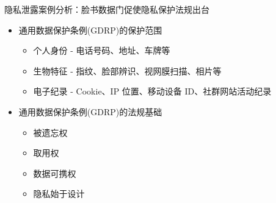 \documentclass[11pt]{beamer}
\begin{document}
\begin{frame}{隐私泄露案例分析：脸书数据门促使隐私保护法规出台}
	
	\begin{minipage}[t]{0.5\linewidth}
		\begin{itemize}
			\item 通用数据保护条例(GDRP)的保护范围
			\begin{itemize}
				\item 个人身份 - {\tiny 电话号码、地址、车牌等}
				\item 生物特征 - {\tiny  指纹、脸部辨识、视网膜扫描、相片等}
				\item 电子纪录 - {\tiny Cookie、IP 位置、移动设备 ID、社群网站活动纪录}
			\end{itemize}
			\item 通用数据保护条例(GDRP)的法规基础
			\begin{itemize}
				\item 被遗忘权
				\item 取用权
				\item 数据可携权 
				\item 隐私始于设计
			\end{itemize}
		\end{itemize}
	\end{minipage}%
	\begin{minipage}[t]{0.4\linewidth}
		\begin{figure}
			\centering
\end{figure}
\end{minipage}
\end{frame}
\end{document}
